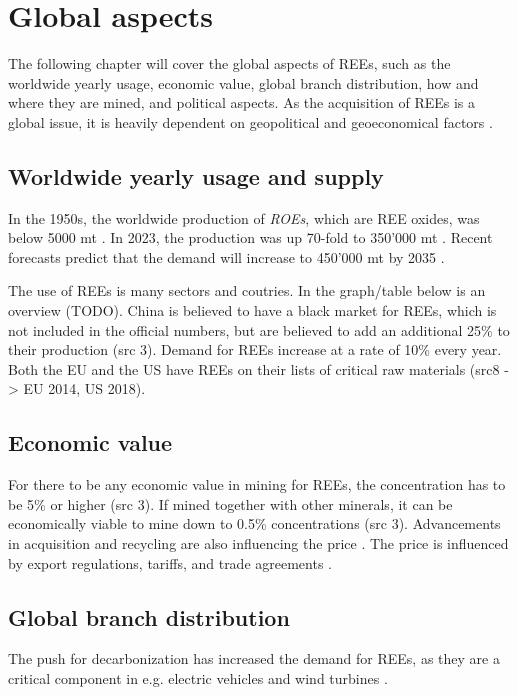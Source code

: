 
\section{Global aspects}

The following chapter will cover the global aspects of REEs, such as the worldwide yearly usage, economic value, global branch distribution, how and where they are mined, and political aspects. As the acquisition of REEs is a global issue, it is heavily dependent on geopolitical and geoeconomical factors \cite{politics2022}.

\subsection{Worldwide yearly usage and supply}

In the 1950s, the worldwide production of \textit{ROEs}, which are REE oxides, was below 5000 mt \cite{REEPrediction}. In 2023, the production was up 70-fold to 350'000 mt \cite{REEPrediction}. Recent forecasts predict that the demand will increase to 450'000 mt by 2035 \cite{REEPrediction}.

The use of REEs is many sectors and coutries. In the graph/table below is an overview (TODO). China is believed to have a black market for REEs, which is not included in the official numbers, but are believed to add an additional 25\% to their production (src 3). Demand for REEs increase at a rate of 10\% every year. Both the EU and the US have REEs on their lists of critical raw materials (src8 -> EU 2014, US 2018).

\subsection{Economic value}

For there to be any economic value in mining for REEs, the concentration has to be 5\% or higher (src 3). If mined together with other minerals, it can be economically viable to mine down to 0.5\% concentrations (src 3). Advancements in acquisition and recycling are also influencing the price \cite{REELandscape}. The price is influenced by export regulations, tariffs, and trade agreements \cite{politics2022}.

\subsection{Global branch distribution}

The push for decarbonization has increased the demand for REEs, as they are a critical component in e.g. electric vehicles and wind turbines \cite{windturbines2022}.


